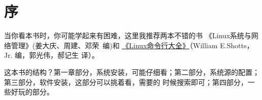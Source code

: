 \chapter{序}

当你看本书时，你可能学起来有困难，这里我推荐两本不错的书 《Linux系统与网络管理》(姜大庆、周建、邓荣~编)和 
\href{https://item.jd.com/11196146.html}{《Linux命令行大全》}（William E.Shotts，Jr. 编，郭光伟，郝记生 译）。


这本书的结构？第一章部分，系统安装，可能仔细看；第二部分，系统源的配置；第三部分，软件安装，这部分可以挑着看，需要的
时候搜索即可；第四部分，一些好玩的部分。